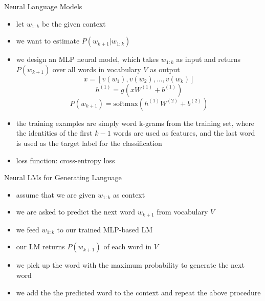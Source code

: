 \begin{frame}{Neural Language Models}
    \begin{itemize}
        \item<1-> let $w_{1:k}$ be the given context
        \item<2-> we want to estimate $P(w_{k+1}|w_{1:k})$ 
        \item<3-> we design an MLP neural model, which takes $w_{1:k}$ as input and returns $P(w_{k+1})$ over all words in vocabulary $V$ as output
        \begin{equation*}
            x  = [v(w_1), v(w_2), ..., v(w_k)]
        \end{equation*}
        \begin{equation*}
            h^{(1)} = g(xW^{(1)}+b^{(1)})
        \end{equation*}
        \begin{equation*}
            P(w_{k+1}) = \text{softmax}(h^{(1)}W^{(2)}+b^{(2)})
        \end{equation*}
        \item<4-> the training examples are simply word k-grams from the training set, where the identities of the first $k-1$ words are used as features, and the last word is used as the target label for the classification
        \item<5-> loss function: cross-entropy loss
    \end{itemize}
\end{frame}
\begin{frame}{Neural LMs for Generating Language}
    \begin{itemize}
        \item<1-> assume that we are given $w_{1:k}$ as context
        \item<2-> we are asked to predict the next word $w_{k+1}$ from vocabulary $V$
        \item<3-> we feed $w_{1:k}$ to our trained MLP-based LM 
        \item<4-> our LM returns $P(w_{k+1})$ of each word in $V$ 
        \item<5-> we pick up the word with the maximum probability to generate the next word
        \item<6-> we add the the predicted word to the context and repeat the above procedure
    \end{itemize}
\end{frame}